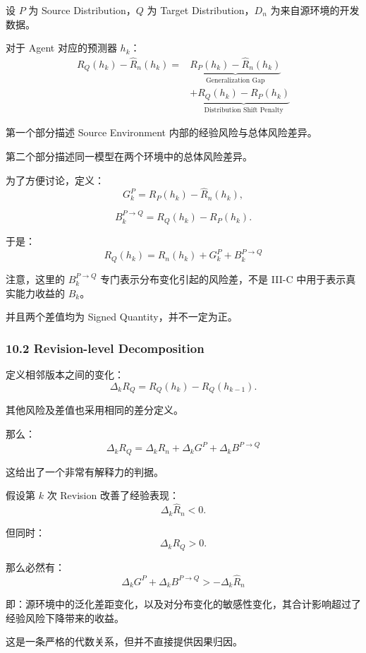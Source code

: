 设 \(P\) 为 Source Distribution，\(Q\) 为 Target Distribution，\(D_n\) 为来自源环境的开发数据。

对于 Agent 对应的预测器 \(h_k\)：
\[\boxed{
\begin{aligned}
R_Q(h_k)-\widehat R_n(h_k)
={}&
\underbrace{
R_P(h_k)-\widehat R_n(h_k)
}_{\text{Generalization Gap}}\\
&+
\underbrace{
R_Q(h_k)-R_P(h_k)
}_{\text{Distribution Shift Penalty}}
\end{aligned}
}\]

第一个部分描述 Source Environment 内部的经验风险与总体风险差异。

第二个部分描述同一模型在两个环境中的总体风险差异。

为了方便讨论，定义：
\[G_k^P
=
R_P(h_k)-\widehat R_n(h_k),\]

\[B_k^{P\rightarrow Q}
=
R_Q(h_k)-R_P(h_k).\]

于是：
\[\boxed{
R_Q(h_k)
=
\widehat R_n(h_k)
+
G_k^P
+
B_k^{P\rightarrow Q}
}\]

注意，这里的 \(B_k^{P\rightarrow Q}\) 专门表示分布变化引起的风险差，不是 III-C 中用于表示真实能力收益的 \(B_k\)。

并且两个差值均为 Signed Quantity，并不一定为正。

\hypertarget{part-4-77-0001-revision-level-decomposition}{%
\subsubsection{10.2 Revision-level Decomposition}\label{part-4-77-0001-revision-level-decomposition}}

定义相邻版本之间的变化：
\[\Delta_kR_Q
=
R_Q(h_k)-R_Q(h_{k-1}).\]

其他风险及差值也采用相同的差分定义。

那么：
\[\boxed{
\Delta_kR_Q
=
\Delta_k\widehat R_n
+
\Delta_kG^P
+
\Delta_kB^{P\rightarrow Q}
}\]

这给出了一个非常有解释力的判据。

假设第 \(k\) 次 Revision 改善了经验表现：
\[\Delta_k\widehat R_n<0.\]

但同时：
\[\Delta_kR_Q>0.\]

那么必然有：
\[\boxed{
\Delta_kG^P
+
\Delta_kB^{P\rightarrow Q}
>
-\Delta_k\widehat R_n
}\]

即：源环境中的泛化差距变化，以及对分布变化的敏感性变化，其合计影响超过了经验风险下降带来的收益。

这是一条严格的代数关系，但并不直接提供因果归因。

